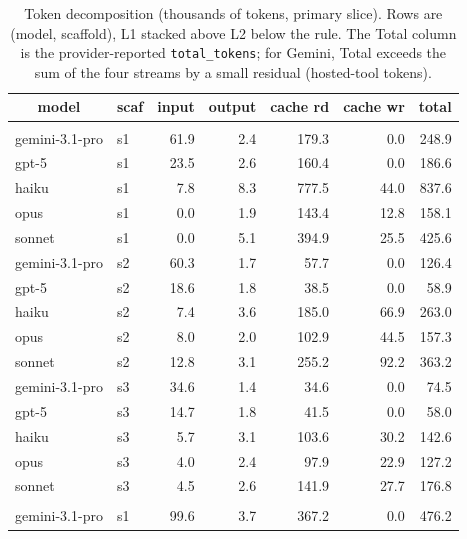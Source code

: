 \documentclass[10pt]{article} %
\begin{document}
    \begin{table}[h]
        \caption{Token decomposition (thousands of tokens, primary slice). Rows are (model, scaffold), L1 stacked above L2 below the rule. The Total column is the provider-reported \texttt{total\_tokens}; for Gemini, Total exceeds the sum of the four streams by a small residual (hosted-tool tokens).}
    \label{tab:rq3_tokens_primary}
    \begin{center}
    \footnotesize
    \begin{tabular}{llrrrrr}
        \multicolumn{1}{c}{\bf model} & \multicolumn{1}{c}{\bf scaf} & \multicolumn{1}{c}{\bf input} & \multicolumn{1}{c}{\bf output} & \multicolumn{1}{c}{\bf cache rd} & \multicolumn{1}{c}{\bf cache wr} & \multicolumn{1}{c}{\bf total} \\
        \hline \\
        gemini-3.1-pro & s1 & 61.9  & 2.4 & 179.3  & 0.0  & 248.9  \\
        gpt-5          & s1 & 23.5  & 2.6 & 160.4  & 0.0  & 186.6  \\
        haiku          & s1 & 7.8   & 8.3 & 777.5  & 44.0 & 837.6  \\
        opus           & s1 & 0.0   & 1.9 & 143.4  & 12.8 & 158.1  \\
        sonnet         & s1 & 0.0   & 5.1 & 394.9  & 25.5 & 425.6  \\
        gemini-3.1-pro & s2 & 60.3  & 1.7 & 57.7   & 0.0  & 126.4  \\
        gpt-5          & s2 & 18.6  & 1.8 & 38.5   & 0.0  & 58.9   \\
        haiku          & s2 & 7.4   & 3.6 & 185.0  & 66.9 & 263.0  \\
        opus           & s2 & 8.0   & 2.0 & 102.9  & 44.5 & 157.3  \\
        sonnet         & s2 & 12.8  & 3.1 & 255.2  & 92.2 & 363.2  \\
        gemini-3.1-pro & s3 & 34.6  & 1.4 & 34.6   & 0.0  & 74.5   \\
        gpt-5          & s3 & 14.7  & 1.8 & 41.5   & 0.0  & 58.0   \\
        haiku          & s3 & 5.7   & 3.1 & 103.6  & 30.2 & 142.6  \\
        opus           & s3 & 4.0   & 2.4 & 97.9   & 22.9 & 127.2  \\
        sonnet         & s3 & 4.5   & 2.6 & 141.9  & 27.7 & 176.8  \\
        \hline \\
        gemini-3.1-pro & s1 & 99.6  & 3.7 & 367.2  & 0.0   & 476.2  \\

\end{tabular}
\end{center}
\end{table}
\end{document}
